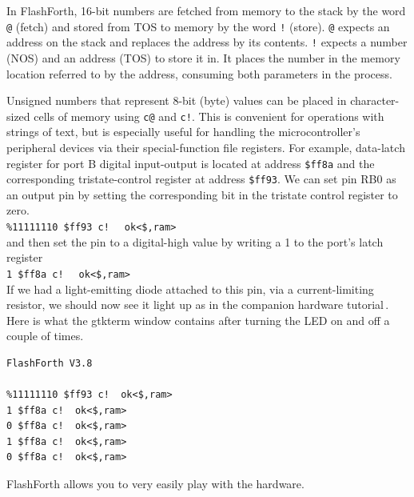 \documentclass[12pt,a4paper]{article}
\begin{document}
\medskip
In FlashForth, 16-bit numbers are fetched from memory to the stack by the word \verb!@! (fetch)
and stored from TOS to memory by the word \verb?!? (store).
\verb?@? expects an address on the stack and replaces the address by its contents.
\verb?!? expects a number (NOS) and an address (TOS) to store it in.
It places the number in the memory location referred to by the address, 
consuming both parameters in the process.

\medskip
Unsigned numbers that represent 8-bit (byte) values can be placed in character-sized cells
of memory using \verb?c@? and \verb?c!?.
This is convenient for operations with strings of text, but is especially useful
for handling the microcontroller's peripheral devices via their special-function
file registers.
For example, data-latch register for port B digital input-output 
is located at address \verb!$ff8a! 
and the corresponding tristate-control register at address \verb!$ff93!.
We can set pin RB0 as an output pin by setting the corresponding bit in the 
tristate control register to zero. \vspace{7pt} \\
\verb?%11111110 $ff93 c! ? \fbox{$\hookleftarrow$} \verb! ok<$,ram>! \vspace{7pt} \\
and then set the pin to a digital-high value by writing a 1 to the port's latch register \vspace{7pt} \\
\verb?1 $ff8a c! ? \fbox{$\hookleftarrow$} \verb! ok<$,ram>! \vspace{7pt} \\
If we had a light-emitting diode attached to this pin, via a current-limiting resistor,
we should now see it light up as in the companion hardware tutorial\,\cite{jacobs_2012b}.
Here is what the gtkterm window contains after turning the LED on and off a couple of times.
\begin{verbatim}
FlashForth V3.8

%11111110 $ff93 c!  ok<$,ram>
1 $ff8a c!  ok<$,ram>
0 $ff8a c!  ok<$,ram>
1 $ff8a c!  ok<$,ram>
0 $ff8a c!  ok<$,ram>
\end{verbatim}
FlashForth allows you to very easily play with the hardware.


\medskip
\end{document}
